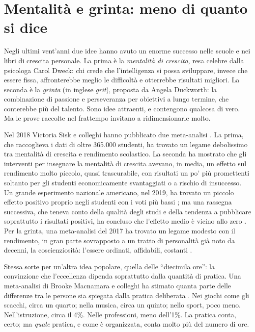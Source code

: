 \section{Mentalità e grinta: meno di quanto si dice}

Negli ultimi vent'anni due idee hanno avuto un enorme successo nelle
scuole e nei libri di crescita personale. La prima è la
\emph{mentalità di crescita}, resa celebre dalla psicologa Carol Dweck:
chi crede che l'intelligenza si possa sviluppare, invece che essere
fissa, affronterebbe meglio le difficoltà e otterrebbe risultati
migliori. La seconda è la \emph{grinta} (in inglese \emph{grit}),
proposta da Angela Duckworth: la combinazione di passione e
perseveranza per obiettivi a lungo termine, che conterebbe più del
talento. Sono idee attraenti, e contengono qualcosa di vero. Ma le
prove raccolte nel frattempo invitano a ridimensionarle molto.

Nel 2018 Victoria Sisk e colleghi hanno pubblicato due meta-analisi
\parencite{sisk2018}. La prima, che raccoglieva i dati di oltre
365.000 studenti, ha trovato un legame debolissimo tra mentalità di
crescita e rendimento scolastico. La seconda ha mostrato che gli
interventi per insegnare la mentalità di crescita avevano, in media, un
effetto sul rendimento
molto piccolo, quasi trascurabile, con risultati un po' più
promettenti soltanto per gli studenti economicamente svantaggiati o a
rischio di insuccesso. Un grande esperimento nazionale americano, nel
2019, ha trovato un piccolo effetto positivo proprio negli studenti con
i voti più bassi \parencite{yeager2019}; ma una rassegna successiva,
che teneva conto della qualità degli studi e della tendenza a
pubblicare soprattutto i risultati positivi, ha concluso che l'effetto
medio è vicino allo zero \parencite{macnamara2023}. Per la grinta, una
meta-analisi del 2017 ha trovato un legame modesto con il rendimento,
in gran parte sovrapposto a un tratto di personalità già noto da
decenni, la coscienziosità: l'essere ordinati, affidabili, costanti
\parencite{crede2017}.

Stessa sorte per un'altra idea popolare, quella delle \enquote{diecimila
ore}: la convinzione che l'eccellenza dipenda soprattutto dalla quantità
di pratica. Una meta-analisi di Brooke Macnamara e colleghi ha stimato
quanta parte delle differenze tra le persone sia spiegata dalla pratica
deliberata \parencite{macnamara2014}. Nei giochi come gli scacchi, circa
un quarto; nella musica, circa un quinto; nello sport, poco meno.
Nell'istruzione, circa il 4\%. Nelle professioni, meno dell'1\%. La
pratica conta, certo; ma \emph{quale} pratica, e come è organizzata,
conta molto più del numero di ore.

